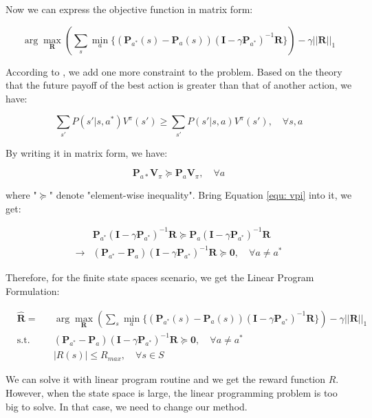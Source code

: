\documentclass[11pt]{article}
\begin{document}
Now we can express the objective function in matrix form:

$$\arg \max_{\mathbf{R}}(\sum_s \min_a \{ (\mathbf{P}_{a^*}(s) - \mathbf{P}_{a}(s)) (\mathbf{I} - \gamma\mathbf{P}_{a^*})^{-1} \mathbf{R}\}) - \gamma ||\mathbf{R}||_1$$

According to \cite{ng2000algorithms}, we add one more constraint to the problem. Based on the theory that the future payoff of the best action is greater than that of another action, we have:

$$\sum_{s'} P(s'|s, a^*)V^\pi(s') \geq \sum_{s'} P(s'|s,a)V^\pi(s'), \quad \forall{s,a}$$

By writing it in matrix form, we have:

$$\mathbf{P}_{a*} \mathbf{V}_\pi \succeq \mathbf{P}_a\mathbf{V}_\pi, \quad \forall{a}$$

where "$\succeq$" denote "element-wise inequality". Bring Equation \ref{equ: vpi} into it, we get:

\begin{equation*}
\begin{split}
&\mathbf{P}_{a^*} (\mathbf{I} - \gamma\mathbf{P}_{a^*})^{-1} \mathbf{R} \succeq \mathbf{P}_{a} (\mathbf{I} - \gamma\mathbf{P}_{a^*})^{-1} \mathbf{R}\\
\rightarrow &(\mathbf{P}_{a^*}- \mathbf{P}_{a}) (\mathbf{I} - \gamma\mathbf{P}_{a^*})^{-1} \mathbf{R} \succeq \mathbf{0}, \quad \forall{a \neq a^*}
\end{split}
\end{equation*}



Therefore, for the finite state spaces scenario, we get the Linear Program Formulation:

\begin{equation*}
\begin{aligned}
& \hat{\mathbf{R}}  =  & & \arg \max_{\mathbf{R}}(\sum_s \min_a \{ (\mathbf{P}_{a^*}(s) - \mathbf{P}_{a}(s)) (\mathbf{I} - \gamma\mathbf{P}_{a^*})^{-1} \mathbf{R}\}) - \gamma ||\mathbf{R}||_1 \\
& \text{s.t.} & & (\mathbf{P}_{a^*}- \mathbf{P}_{a}) (\mathbf{I} - \gamma\mathbf{P}_{a^*})^{-1} \mathbf{R} \succeq \mathbf{0}, \quad \forall{a \neq a^*} \\
& & & |R(s)| \leq R_{max}, \quad \forall{s \in S}
\end{aligned}
\end{equation*}

We can solve it with linear program routine and we get the reward function $R$. However, when the state space is large, the linear programming problem is too big to solve. In that case, we need to change our method.
\end{document}
